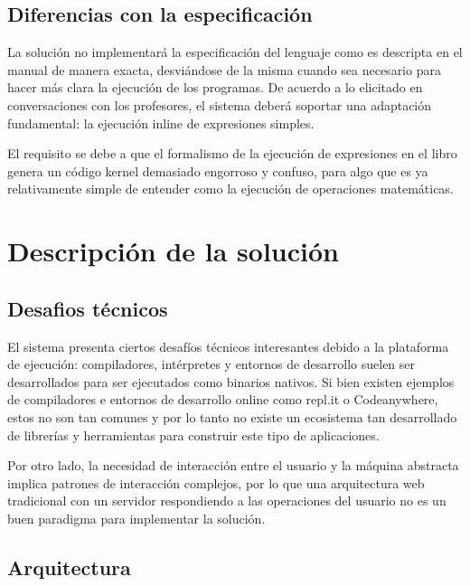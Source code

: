 \documentclass[a4paper,11pt]{article}
\begin{document}
 
\subsection{Diferencias con la especificación}

La solución no implementará la especificación del lenguaje como es descripta en el manual de manera exacta, desviándose de la misma cuando sea necesario para hacer más clara la ejecución de los programas. De acuerdo a lo elicitado en conversaciones con los profesores, el sistema deberá soportar una adaptación fundamental: la ejecución inline de expresiones simples.

El requisito se debe a que el formalismo de la ejecución de expresiones en el libro genera un código kernel demasiado engorroso y confuso, para algo que es ya relativamente simple de entender como la ejecución de operaciones matemáticas.

\section{Descripción de la solución}

\subsection{Desafios técnicos}

El sistema presenta ciertos desafíos técnicos interesantes debido a la plataforma de ejecución: compiladores, intérpretes y entornos de desarrollo suelen ser desarrollados para ser ejecutados como binarios nativos. Si bien existen ejemplos de compiladores e entornos de desarrollo online como repl.it\cite{replit} o Codeanywhere\cite{codeanywhere}, estos no son tan comunes y por lo tanto no existe un ecosistema tan desarrollado de librerías y herramientas para construir este tipo de aplicaciones.

Por otro lado, la necesidad de interacción entre el usuario y la máquina abstracta implica patrones de interacción complejos, por lo que una arquitectura web tradicional con un servidor respondiendo a las operaciones del usuario no es un buen paradigma para implementar la solución.

\subsection{Arquitectura}
\end{document}
